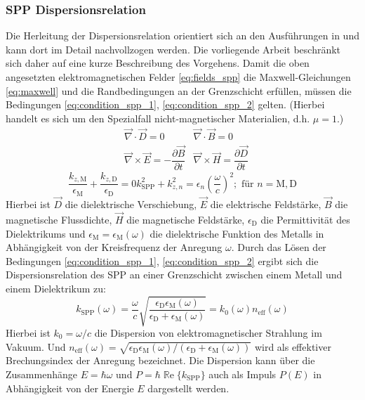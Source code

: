 \documentclass[titlepage,  ngerman]{article}
\renewcommand{\Re}{\operatorname{\mathbb{R}e}}
\begin{document}
	\subsubsection{SPP Dispersionsrelation}
	Die Herleitung der Dispersionsrelation orientiert sich an den Ausführungen in \cite[pp.~261--ff]{Fox.2020} und kann dort im Detail nachvollzogen werden. Die vorliegende Arbeit beschränkt sich daher auf eine kurze Beschreibung des Vorgehens. Damit die oben angesetzten elektromagnetischen Felder \eqref{eq:fields_spp}  die Maxwell-Gleichungen \eqref{eq:maxwell} und die Randbedingungen an der Grenzschicht erfüllen, müssen die Bedingungen \eqref{eq:condition_spp_1},  \eqref{eq:condition_spp_2} gelten. (Hierbei handelt es sich um den Spezialfall nicht-magnetischer Materialien, d.h. $\mu = 1$.)
	\begin{align}
		\label{eq:maxwell}	
		&\vec{\nabla}\cdot\vec{D} = 0		&\vec{\nabla}\cdot\vec{B} = 0 \\
		&\vec{\nabla}\times\vec{E} = -\dfrac{\partial\vec{B}}{\partial t} 
		&\vec{\nabla}\times\vec{H} = 	\dfrac{\partial\vec{D}}{\partial t}\nonumber
	\end{align}
	\begin{subequations}
		\begin{equation}
			\label{eq:condition_spp_1}
			\dfrac{k_{z, \mathrm{M}}}{\epsilon_\mathrm{M}} + \dfrac{k_{z, \mathrm{D}}}{\epsilon_\mathrm{D}} = 0
		\end{equation}		
		\begin{equation}
			\label{eq:condition_spp_2}
			k_{\mathrm{SPP}}^2 +k_{z, n}^2 = \epsilon_n\left(\dfrac{\omega}{c}\right)^2; \text{ für  } n=\mathrm{M,D}
		\end{equation}
	\end{subequations}
	Hierbei ist $\vec{D}$ die dielektrische Verschiebung, $\vec{E}$ die elektrische Feldstärke, $\vec{B}$ die magnetische Flussdichte, $\vec{H}$ die magnetische Feldstärke, 	$\epsilon_\mathrm{D}$ die Permittivität des Dielektrikums und $\epsilon_\mathrm{M} = \epsilon_\mathrm{M}(\omega)$ die dielektrische Funktion des Metalls in Abhängigkeit von der Kreisfrequenz der Anregung $\omega$. Durch das Lösen der Bedingungen \eqref{eq:condition_spp_1},  \eqref{eq:condition_spp_2} ergibt sich die Dispersionsrelation des SPP an einer Grenzschicht zwischen einem Metall und einem Dielektrikum zu: 
	\begin{equation}
		\label{eq:dispersion_spp}
		\boxed{
			k_{\mathrm{SPP}}\left(\omega\right) = \dfrac{\omega}{c} \sqrt{\dfrac{\epsilon_\mathrm{D}\epsilon_\mathrm{M}(\omega)}{\epsilon_\mathrm{D} + 	\epsilon_\mathrm{M}(\omega)}}  = k_0(\omega) n_{\mathrm{eff}}(\omega)}
	\end{equation}
	Hierbei ist $k_0 = \omega / c$ die Dispersion von elektromagnetischer Strahlung im Vakuum. Und $n_{\mathrm{eff}}(\omega) = \sqrt{\epsilon_\mathrm{D}\epsilon_\mathrm{M}(\omega)/(\epsilon_\mathrm{D} + 	\epsilon_\mathrm{M}(\omega))}$ wird als effektiver Brechungsindex der Anregung bezeichnet. Die Dispersion kann über die Zusammenhänge $E = \hbar \omega$ und $P = \hbar \Re\{k_\mathrm{SPP}\}$ auch als Impuls $P(E)$ in Abhängigkeit von der Energie $E$ dargestellt werden.
	
\end{document}
